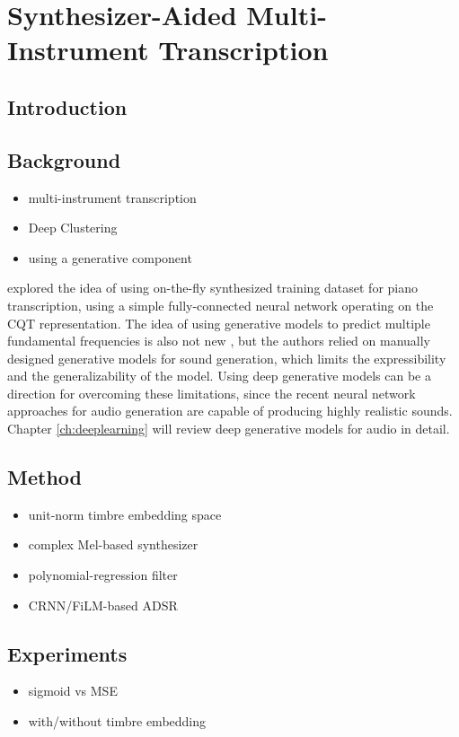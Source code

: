 
\graphicspath{{7-timbre/figures/}}

\chapter{Synthesizer-Aided Multi-Instrument Transcription}
\label{ch:timbre}

\section{Introduction}

\section{Background}

\begin{itemize}
	\item multi-instrument transcription
	\item Deep Clustering
	\item using a generative component
\end{itemize}


 explored the idea of using on-the-fly synthesized training dataset for piano transcription, using a simple fully-connected neural network operating on the CQT representation.
The idea of using generative models to predict multiple fundamental frequencies is also not new \cite{dubois2005harmonic,cemgil2006generative}, but the authors relied on manually designed generative models for sound generation, which limits the expressibility and the generalizability of the model.
Using deep generative models can be a direction for overcoming these limitations, since the recent neural network approaches for audio generation are capable of producing highly realistic sounds.
Chapter \ref{ch:deeplearning} will review deep generative models for audio in detail.


\section{Method}

\begin{itemize}
	\item unit-norm timbre embedding space
	\item complex Mel-based synthesizer
	\item polynomial-regression filter
	\item CRNN/FiLM-based ADSR
\end{itemize}

\section{Experiments}

\begin{itemize}
	\item sigmoid vs MSE
	\item with/without timbre embedding
\end{itemize}